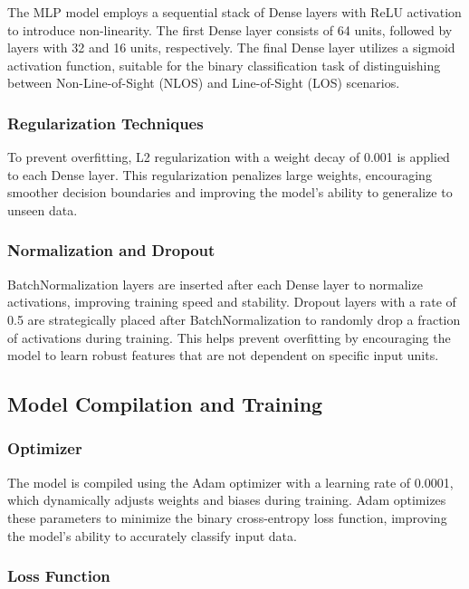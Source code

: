 The MLP model employs a sequential stack of Dense layers with ReLU activation to introduce non-linearity. The first Dense layer consists of 64 units, followed by layers with 32 and 16 units, respectively. The final Dense layer utilizes a sigmoid activation function, suitable for the binary classification task of distinguishing between Non-Line-of-Sight (NLOS) and Line-of-Sight (LOS) scenarios.

\subsubsection{Regularization Techniques}

To prevent overfitting, L2 regularization with a weight decay of 0.001 is applied to each Dense layer. This regularization penalizes large weights, encouraging smoother decision boundaries and improving the model's ability to generalize to unseen data.

\subsubsection{Normalization and Dropout}

BatchNormalization layers are inserted after each Dense layer to normalize activations, improving training speed and stability. Dropout layers with a rate of 0.5 are strategically placed after BatchNormalization to randomly drop a fraction of activations during training. This helps prevent overfitting by encouraging the model to learn robust features that are not dependent on specific input units.

\subsection{Model Compilation and Training}

\subsubsection{Optimizer}

The model is compiled using the Adam optimizer with a learning rate of 0.0001, which dynamically adjusts weights and biases during training. Adam optimizes these parameters to minimize the binary cross-entropy loss function, improving the model's ability to accurately classify input data.

\subsubsection{Loss Function}

